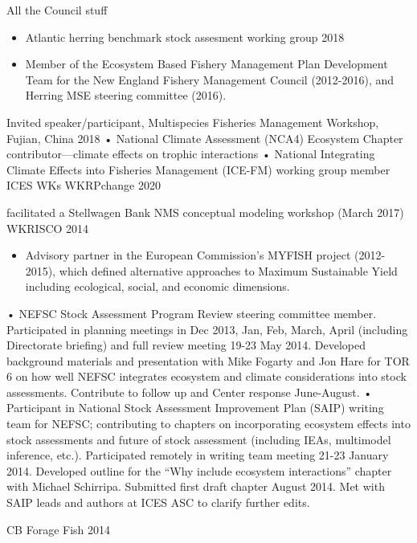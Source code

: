 \documentclass[11pt, a4paper]{awesome-cv}
\providecommand{\tightlist}{%
	\setlength{\itemsep}{0pt}\setlength{\parskip}{0pt}}
\begin{document}
All the Council stuff

\begin{itemize}
\tightlist
\item
  Atlantic herring benchmark stock assesment working group 2018
\item
  Member of the Ecosystem Based Fishery Management Plan Development Team
  for the New England Fishery Management Council (2012-2016), and
  Herring MSE steering committee (2016).
\end{itemize}

Invited speaker/participant, Multispecies Fisheries Management Workshop,
Fujian, China 2018 • National Climate Assessment (NCA4) Ecosystem
Chapter contributor---climate effects on trophic interactions • National
Integrating Climate Effects into Fisheries Management (ICE-FM) working
group member ICES WKs WKRPchange 2020

facilitated a Stellwagen Bank NMS conceptual modeling workshop (March
2017) WKRISCO 2014

\begin{itemize}
\tightlist
\item
  Advisory partner in the European Commission's MYFISH project
  (2012-2015), which defined alternative approaches to Maximum
  Sustainable Yield including ecological, social, and economic
  dimensions.
\end{itemize}

• NEFSC Stock Assessment Program Review steering committee member.
Participated in planning meetings in Dec 2013, Jan, Feb, March, April
(including Directorate briefing) and full review meeting 19-23 May 2014.
Developed background materials and presentation with Mike Fogarty and
Jon Hare for TOR 6 on how well NEFSC integrates ecosystem and climate
considerations into stock assessments. Contribute to follow up and
Center response June-August. • Participant in National Stock Assessment
Improvement Plan (SAIP) writing team for NEFSC; contributing to chapters
on incorporating ecosystem effects into stock assessments and future of
stock assessment (including IEAs, multimodel inference, etc.).
Participated remotely in writing team meeting 21-23 January 2014.
Developed outline for the ``Why include ecosystem interactions'' chapter
with Michael Schirripa. Submitted first draft chapter August 2014. Met
with SAIP leads and authors at ICES ASC to clarify further edits.

CB Forage Fish 2014
\end{document}
